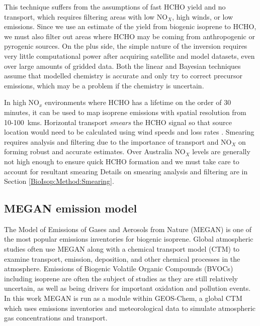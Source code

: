       {\label{BioIsop:intro:top_down_linear:fig_RMA_example}}
      
      This technique suffers from the assumptions of fast HCHO yield and no transport, which requires filtering areas with low NO$_X$, high winds, or low emissions.
      Since we use an estimate of the yield from biogenic isoprene to HCHO, we must also filter out areas where HCHO may be coming from anthropogenic or pyrogenic sources.
      On the plus side, the simple nature of the inversion requires very little computational power after acquiring satellite and model datasets, even over large amounts of gridded data.
      Both the linear and Bayesian techniques assume that modelled chemistry is accurate and only try to correct precursor emissions, which may be a problem if the chemistry is uncertain.
      
      In high NO$_x$ environments where HCHO has a lifetime on the order of 30 minutes, it can be used to map isoprene emissions with spatial resolution from 10-100~kms.
      Horizontal transport \textit{smears} the HCHO signal so that source location would need to be calculated using wind speeds and loss rates \parencite{Palmer2001,Palmer2003}.
      Smearing requires analysis and filtering due to the importance of transport and NO$_X$ on forming robust and accurate estimates.
      Over Australia NO$_X$ levels are generally not high enough to ensure quick HCHO formation and we must take care to account for resultant smearing
      Details on smearing analysis and filtering are in Section \ref{BioIsop:Method:Smearing}.
    
      
  \subsection{MEGAN emission model}
    The Model of Emissions of Gases and Aerosols from Nature (MEGAN) is one of the most popular emissions inventories for biogenic isoprene.
    Global atmospheric studies often use MEGAN along with a chemical transport model (CTM) to examine transport, emission, deposition, and other chemical processes in the atmosphere.
    Emissions of Biogenic Volatile Organic Compounds (BVOCs) including isoprene are often the subject of studies as they are still relatively uncertain, as well as being drivers for important oxidation and pollution events.
    In this work MEGAN is run as a module within GEOS-Chem, a global CTM which uses emissions inventories and meteorological data to simulate atmospheric gas concentrations and transport.
    
